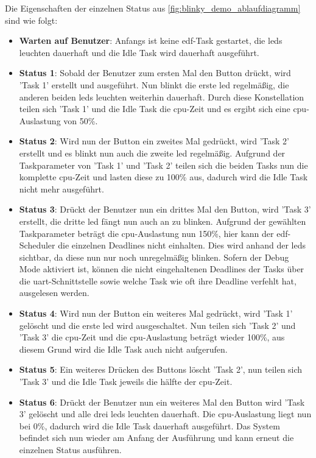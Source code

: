 \documentclass[../EDF Master Thesis.tex]{subfiles}
\begin{document}
    Die Eigenschaften der einzelnen Status aus \autoref{fig:blinky_demo_ablaufdiagramm} sind wie folgt:
    \begin{itemize}
        \item \textbf{Warten auf Benutzer}: Anfangs ist keine \ac{edf}-Task gestartet, die \ac{led}s leuchten dauerhaft und die Idle Task wird dauerhaft ausgeführt.
        \item \textbf{Status 1}: Sobald der Benutzer zum ersten Mal den Button drückt, wird 'Task 1' erstellt und ausgeführt.
            Nun blinkt die erste \ac{led} regelmäßig, die anderen beiden \ac{led}s leuchten weiterhin dauerhaft.
            Durch diese Konstellation teilen sich 'Task 1' und die Idle Task die \ac{cpu}-Zeit und es ergibt sich eine \ac{cpu}-Auslastung von 50\%.
        \item \textbf{Status 2}: Wird nun der Button ein zweites Mal gedrückt, wird 'Task 2' erstellt und es blinkt nun auch die zweite \ac{led} regelmäßig.
            Aufgrund der Taskparameter von 'Task 1' und 'Task 2' teilen sich die beiden Tasks nun die komplette \ac{cpu}-Zeit und lasten diese zu 100\% aus, dadurch wird die Idle Task nicht mehr ausgeführt.
        \item \textbf{Status 3}: Drückt der Benutzer nun ein drittes Mal den Button, wird 'Task 3' erstellt, die dritte \ac{led} fängt nun auch an zu blinken.
            Aufgrund der gewählten Taskparameter beträgt die \ac{cpu}-Auslastung nun 150\%, hier kann der \ac{edf}-Scheduler die einzelnen Deadlines nicht einhalten.
            Dies wird anhand der \ac{led}s sichtbar, da diese nun nur noch unregelmäßig blinken.
            Sofern der Debug Mode aktiviert ist, können die nicht eingehaltenen Deadlines der Tasks über die \ac{uart}-Schnittstelle sowie welche Task wie oft ihre Deadline verfehlt hat, ausgelesen werden.
        \item \textbf{Status 4}: Wird nun der Button ein weiteres Mal gedrückt, wird 'Task 1' gelöscht und die erste \ac{led} wird ausgeschaltet.
            Nun teilen sich 'Task 2' und 'Task 3' die \ac{cpu}-Zeit und die \ac{cpu}-Auslastung beträgt wieder 100\%, aus diesem Grund wird die Idle Task auch nicht aufgerufen.
        \item \textbf{Status 5}: Ein weiteres Drücken des Buttons löscht 'Task 2', nun teilen sich 'Task 3' und die Idle Task jeweils die hälfte der \ac{cpu}-Zeit.
        \item \textbf{Status 6}: Drückt der Benutzer nun ein weiteres Mal den Button wird 'Task 3' gelöscht und alle drei \ac{led}s leuchten dauerhaft.
            Die \ac{cpu}-Auslastung liegt nun bei 0\%, dadurch wird die Idle Task dauerhaft ausgeführt.
            Das System befindet sich nun wieder am Anfang der Ausführung und kann erneut die einzelnen Status ausführen.
    \end{itemize}
\end{document}
